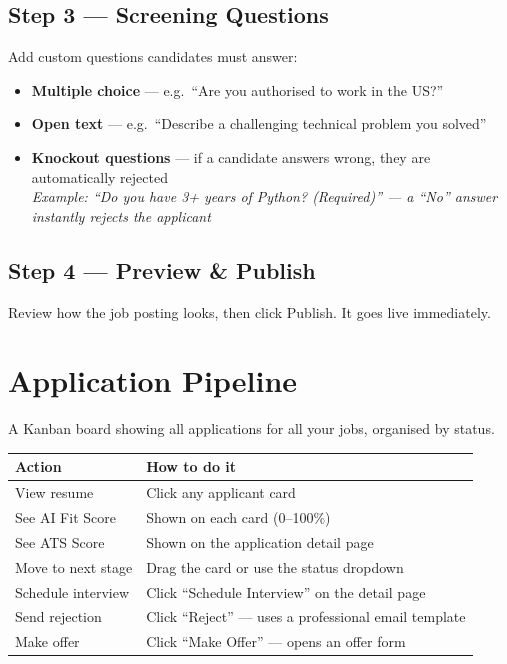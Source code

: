 \documentclass[12pt, a4paper]{report}
\begin{document}
\subsection{Step 3 --- Screening Questions}
Add custom questions candidates must answer:
\begin{itemize}
  \item \textbf{Multiple choice} --- e.g.\ ``Are you authorised to work in the US?''
  \item \textbf{Open text} --- e.g.\ ``Describe a challenging technical problem you solved''
  \item \textbf{Knockout questions} --- if a candidate answers wrong, they are automatically
        rejected\\
        \textit{Example: ``Do you have 3+ years of Python? (Required)'' --- a ``No'' answer
        instantly rejects the applicant}
\end{itemize}

\subsection{Step 4 --- Preview \& Publish}
Review how the job posting looks, then click Publish.  It goes live immediately.

\section{Application Pipeline}

A Kanban board showing all applications for all your jobs, organised by status.

\begin{center}
\begin{tabularx}{\textwidth}{lX}
\toprule
\textbf{Action} & \textbf{How to do it} \\
\midrule
View resume         & Click any applicant card \\
See AI Fit Score    & Shown on each card (0--100\%) \\
See ATS Score       & Shown on the application detail page \\
Move to next stage  & Drag the card or use the status dropdown \\
Schedule interview  & Click ``Schedule Interview'' on the detail page \\
Send rejection      & Click ``Reject'' --- uses a professional email template \\
Make offer          & Click ``Make Offer'' --- opens an offer form \\
\bottomrule
\end{tabularx}
\end{center}
\end{document}
